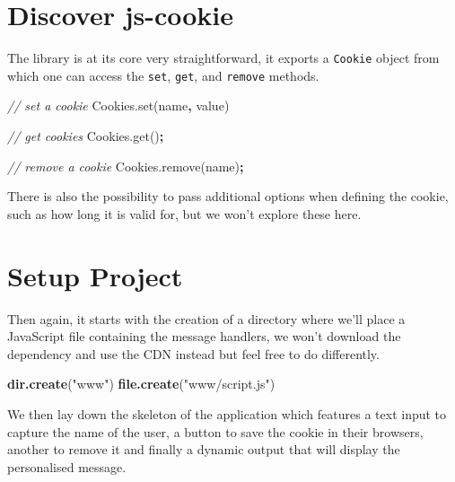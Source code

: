 \documentclass[
]{krantz}
\makeatletter
\newenvironment{Shaded}{\begin{snugshade}}{\end{snugshade}}
\newcommand{\AttributeTok}[1]{\textcolor[rgb]{0.61,0.61,0.61}{#1}}
\newcommand{\CommentTok}[1]{\textcolor[rgb]{0.37,0.37,0.37}{\textit{#1}}}
\newcommand{\KeywordTok}[1]{\textcolor[rgb]{0.27,0.27,0.27}{\textbf{#1}}}
\newcommand{\NormalTok}[1]{#1}
\newcommand{\OperatorTok}[1]{\textcolor[rgb]{0.43,0.43,0.43}{\textbf{#1}}}
\newcommand{\StringTok}[1]{\textcolor[rgb]{0.5,0.5,0.5}{#1}}
\newcommand{\VariableTok}[1]{\textcolor[rgb]{0,0,0}{#1}}
\newenvironment{kframe}{%
\medskip{}
\setlength{\fboxsep}{.8em}
 \def\at@end@of@kframe{}%
 \ifinner\ifhmode%
  \def\at@end@of@kframe{\end{minipage}}%
  \begin{minipage}{\columnwidth}%
 \fi\fi%
 \def\FrameCommand##1{\hskip\@totalleftmargin \hskip-\fboxsep
 \colorbox{shadecolor}{##1}\hskip-\fboxsep
     \hskip-\linewidth \hskip-\@totalleftmargin \hskip\columnwidth}%
 \MakeFramed {\advance\hsize-\width
   \@totalleftmargin\z@ \linewidth\hsize
   \@setminipage}}%
 {\par\unskip\endMakeFramed%
 \at@end@of@kframe}
\renewenvironment{Shaded}{\begin{kframe}}{\end{kframe}}
\makeatother
\begin{document}
\hypertarget{shiny-cookies-discover}{%
\section{Discover js-cookie}\label{shiny-cookies-discover}}

The library is at its core very straightforward, it exports a \texttt{Cookie} object from which one can access the \texttt{set}, \texttt{get}, and \texttt{remove} methods.

\begin{Shaded}
\begin{Highlighting}[]
\CommentTok{// set a cookie}
\VariableTok{Cookies}\NormalTok{.}\AttributeTok{set}\NormalTok{(}\StringTok{\textquotesingle{}name\textquotesingle{}}\OperatorTok{,} \StringTok{\textquotesingle{}value\textquotesingle{}}\NormalTok{)}

\CommentTok{// get cookies}
\VariableTok{Cookies}\NormalTok{.}\AttributeTok{get}\NormalTok{()}\OperatorTok{;}

\CommentTok{// remove a cookie}
\VariableTok{Cookies}\NormalTok{.}\AttributeTok{remove}\NormalTok{(}\StringTok{\textquotesingle{}name\textquotesingle{}}\NormalTok{)}\OperatorTok{;}
\end{Highlighting}
\end{Shaded}

There is also the possibility to pass additional options when defining the cookie, such as how long it is valid for, but we won't explore these here.

\hypertarget{shiny-cookies-setup}{%
\section{Setup Project}\label{shiny-cookies-setup}}

Then again, it starts with the creation of a directory where we'll place a JavaScript file containing the message handlers, we won't download the dependency and use the CDN instead but feel free to do differently.

\begin{Shaded}
\begin{Highlighting}[]
\KeywordTok{dir.create}\NormalTok{(}\StringTok{"www"}\NormalTok{)}
\KeywordTok{file.create}\NormalTok{(}\StringTok{"www/script.js"}\NormalTok{)}
\end{Highlighting}
\end{Shaded}

We then lay down the skeleton of the application which features a text input to capture the name of the user, a button to save the cookie in their browsers, another to remove it and finally a dynamic output that will display the personalised message.
\end{document}
